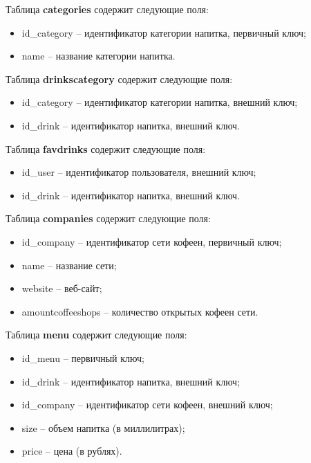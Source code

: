 Таблица \textbf{categories} содержит следующие поля:
\begin{itemize}
	\item id\_category -- идентификатор категории напитка, первичный ключ;%
	\item name -- название категории напитка.%
\end{itemize}

Таблица \textbf{drinkscategory} содержит следующие поля:
\begin{itemize}
\item id\_category -- идентификатор категории напитка, внешний ключ;%
\item id\_drink -- идентификатор напитка, внешний ключ.%
\end{itemize}

Таблица \textbf{favdrinks} содержит следующие поля:
\begin{itemize}
	\item id\_user -- идентификатор пользователя, внешний ключ;%
	\item id\_drink -- идентификатор напитка, внешний ключ.%
\end{itemize}

Таблица \textbf{companies} содержит следующие поля:
\begin{itemize}
	\item id\_company -- идентификатор сети кофеен, первичный ключ;%
	\item name -- название сети;%
	\item website -- веб-сайт;%
	\item amountcoffeeshops -- количество открытых кофеен сети.%
\end{itemize}
	
Таблица \textbf{menu} содержит следующие поля:
	\begin{itemize}
		\item id\_menu -- первичный ключ;%
		\item id\_drink -- идентификатор напитка, внешний ключ;%
		\item id\_company -- идентификатор сети кофеен, внешний ключ;%
		\item size -- объем напитка (в миллилитрах);%
		\item price -- цена (в рублях).%
\end{itemize}

